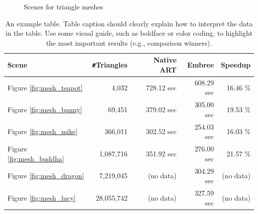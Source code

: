 \begin{figure}
	\hfill
	
	\caption{Scenes for triangle meshes}
	\label{fig:mesh_scenes}
\end{figure}

\begin{table}
	\centering
	{\footnotesize\sf
		\begin{tabular}{lrrrr}
			\toprule
			Scene & \Verb!#!Triangles & Native ART & Embree & Speedup \\ 
			\midrule
			Figure \ref{fig:mesh_teapot} & 4,032 & 728.12 sec & 608.29 sec & 16.46 \% \\
			Figure \ref{fig:mesh_bunny} & 69,451 & 379.02 sec & 305.00 sec & 19.53 \% \\
			Figure \ref{fig:mesh_mike} & 366,011 & 302.52 sec & 254.03 sec & 16.03 \%  \\
			\addlinespace %
			Figure \ref{fig:mesh_buddha} & 1,087,716 & 351.92 sec & 276.00 sec & 21.57 \% \\
			Figure \ref{fig:mesh_dragon} & 7,219,045 & (no data) & 304.29 sec & (no data)  \\
			Figure \ref{fig:mesh_lucy} & 28,055,742 & (no data) & 327.59 sec & (no data)  \\
			\bottomrule
	\end{tabular}}
	\caption{An example table. Table caption should clearly explain how to interpret the data in the table. Use some visual guide, such as boldface or color coding, to highlight the most important results (e.g., comparison winners).}
	\label{tab:mesh}
\end{table}





